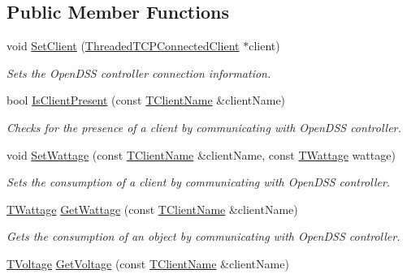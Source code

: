 \subsection*{Public Member Functions}
\begin{DoxyCompactItemize}
\item 
void \hyperlink{class_matlab_manager_ad5ff9f0aacdecada53a107e83b9e3712}{Set\-Client} (\hyperlink{class_threaded_t_c_p_connected_client}{Threaded\-T\-C\-P\-Connected\-Client} $\ast$client)
\begin{DoxyCompactList}\small\item\em Sets the Open\-D\-S\-S controller connection information. \end{DoxyCompactList}\item 
bool \hyperlink{class_matlab_manager_a1c967acc77ef8db3113e83a5325b5729}{Is\-Client\-Present} (const \hyperlink{class_matlab_manager_a62cb494115d46fdf4ecc6bd369fe0320}{T\-Client\-Name} \&client\-Name)
\begin{DoxyCompactList}\small\item\em Checks for the presence of a client by communicating with Open\-D\-S\-S controller. \end{DoxyCompactList}\item 
void \hyperlink{class_matlab_manager_a2967a226a9c6a9ed22998cad67afed3c}{Set\-Wattage} (const \hyperlink{class_matlab_manager_a62cb494115d46fdf4ecc6bd369fe0320}{T\-Client\-Name} \&client\-Name, const \hyperlink{class_matlab_manager_a410b78f356aeacba5c43efee93d8c27d}{T\-Wattage} wattage)
\begin{DoxyCompactList}\small\item\em Sets the consumption of a client by communicating with Open\-D\-S\-S controller. \end{DoxyCompactList}\item 
\hyperlink{class_matlab_manager_a410b78f356aeacba5c43efee93d8c27d}{T\-Wattage} \hyperlink{class_matlab_manager_afc7fd3eb3469eb7be2af5b857e6f45e1}{Get\-Wattage} (const \hyperlink{class_matlab_manager_a62cb494115d46fdf4ecc6bd369fe0320}{T\-Client\-Name} \&client\-Name)
\begin{DoxyCompactList}\small\item\em Gets the consumption of an object by communicating with Open\-D\-S\-S controller. \end{DoxyCompactList}\item 
\hyperlink{class_matlab_manager_a716643f4f29af3225aedf52d61fd0abe}{T\-Voltage} \hyperlink{class_matlab_manager_ab741bd4f6545e11dd7dd28548c5229dd}{Get\-Voltage} (const \hyperlink{class_matlab_manager_a62cb494115d46fdf4ecc6bd369fe0320}{T\-Client\-Name} \&client\-Name)

\end{DoxyCompactItemize}
